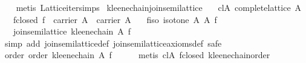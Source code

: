 \begin{isabellebody}
\ \ \isamarkupfalse%
\ {}metis\ Lattice{}iter{}simps{}{}{}{}%
\endisatagproof
{\isafoldproof}%
%
\isadelimproof
\isanewline
%
\endisadelimproof
\isanewline
{}\isamarkupfalse%
\ kleene{}chain{}join{}semilattice{}\isanewline
\ \ \ cl{}A{}\ {}complete{}lattice\ A{}\isanewline
\ \ \ f{}closed{}\ {}f\ {}\ carrier\ A\ {}\ carrier\ A{}\isanewline
\ \ \ f{}iso{}\ {}isotone\ A\ A\ f{}\isanewline
\ \ \ {}join{}semilattice\ {}kleene{}chain\ A\ f{}{}\isanewline
%
\isadelimproof
%
\endisadelimproof
%
\isatagproof
{}\isamarkupfalse%
\ {}simp\ add{}\ join{}semilattice{}def\ join{}semilattice{}axioms{}def{}\ safe{}\isanewline
\ \ \isamarkupfalse%
\ order{}\ {}order\ {}kleene{}chain\ A\ f{}{}\isanewline
\ \ \ \ \isamarkupfalse%
\ {}metis\ cl{}A\ f{}closed\ kleene{}chain{}order{}\isanewline

\end{isabellebody}
